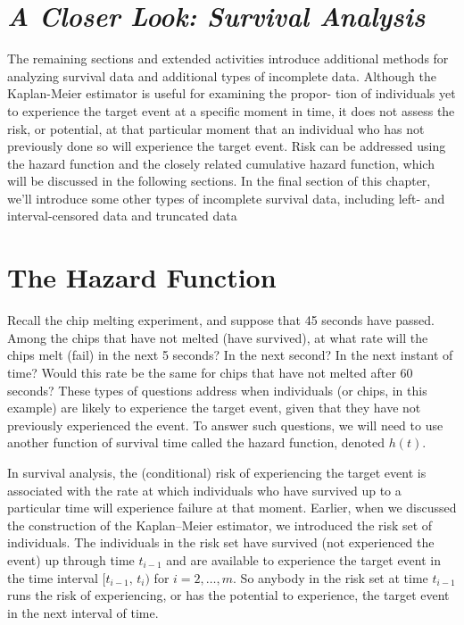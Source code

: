 \documentclass[
]{report}
\begin{document}
\section*{\texorpdfstring{\emph{A Closer Look: Survival Analysis}}{A Closer Look: Survival Analysis}}\label{a-closer-look-survival-analysis}

The remaining sections and extended activities introduce additional methods for analyzing survival data and
additional types of incomplete data. Although the Kaplan-Meier estimator is useful for examining the propor-
tion of individuals yet to experience the target event at a specific moment in time, it does not assess the risk,
or potential, at that particular moment that an individual who has not previously done so will experience
the target event. Risk can be addressed using the hazard function and the closely related cumulative hazard
function, which will be discussed in the following sections. In the final section of this chapter, we'll introduce
some other types of incomplete survival data, including left- and interval-censored data and truncated data

\section{\texorpdfstring{\textbf{The Hazard Function}}{The Hazard Function}}\label{the-hazard-function}

Recall the chip melting experiment, and suppose that 45 seconds have passed. Among the chips that have not melted (have survived), at what rate will the chips melt (fail) in the next 5 seconds? In the next second? In the next instant of time? Would this rate be the same for chips that have not melted after 60 seconds? These types of questions address when individuals (or chips, in this example) are likely to experience the target event, given that they have not previously experienced the event. To answer such questions, we will need to use another function of survival time called the hazard function, denoted \(h(t)\).

In survival analysis, the (conditional) risk of experiencing the target event is associated with the rate at which individuals who have survived up to a particular time will experience failure at that moment. Earlier, when we discussed the construction of the Kaplan--Meier estimator, we introduced the risk set of individuals. The individuals in the risk set have survived (not experienced the event) up through time \(t_{i-1}\) and are available to experience the target event in the time interval \([t_{i-1},\,t_i)\) for \(i = 2, \dots, m\). So anybody in the risk set at time \(t_{i-1}\) runs the risk of experiencing, or has the potential to experience, the target event in the next interval of time.
\end{document}

